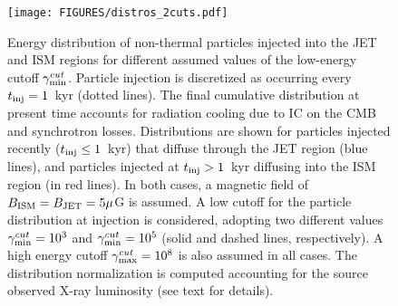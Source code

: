
\begin{figure}[t]
\centering
\texttt{[image: FIGURES/distros\_2cuts.pdf]}
\caption{Energy distribution of non-thermal particles injected into the JET and ISM regions for different assumed values of the low-energy cutoff $\gamma_{\rm min}^{cut}$. Particle injection is discretized as occurring every $t_{\rm inj} = 1$~kyr (dotted lines). The final cumulative distribution at present time accounts for radiation cooling due to IC on the CMB and synchrotron losses. Distributions are shown for particles injected recently ($t_{\rm inj} \leq 1$~kyr) that diffuse through the JET region (blue lines), and particles injected at $t_{\rm inj} > 1$~kyr diffusing into the ISM region (in red lines). In both cases, a magnetic field of $B_{\rm ISM} = B_{\rm JET} = 5\mu$G is assumed. A low cutoff for the particle distribution at injection is considered, adopting two different values $\gamma_{\rm min}^{cut} = 10^{3}$  and $\gamma_{\rm min}^{cut} = 10^{5}$ (solid and dashed lines, respectively). A high energy cutoff $\gamma_{\rm max}^{cut} = 10^{8}$ is also assumed in all cases. The distribution normalization is computed accounting for the source observed X-ray luminosity (see text for details).}
\label{figure:particle_distribution}
\end{figure}
